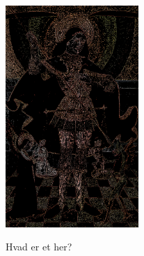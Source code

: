 \begin{figure}[p]
{        \includegraphics[angle=0,width=0.45\textwidth]{afsnit/afprovning/billeder/thressholds/krafitige_farver/krafite_detalier/1_iteration/300-300.png}
        \label{300-300}}\hspace{1em}
    \label{allesammen1}
    \caption{Hvad er et her?}
\end{figure}

\clearpage

